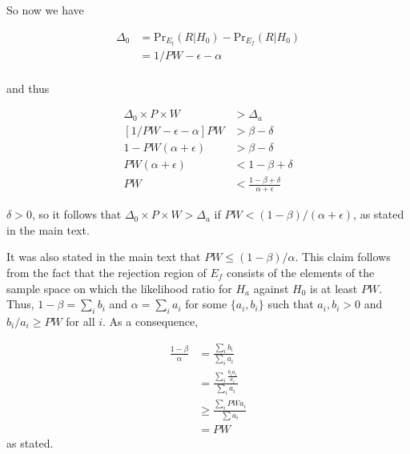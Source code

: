 \documentclass{article}
\theoremstyle{definition}
\begin{document}
So now we have

\begin{align*}
\Delta_0 &=\mbox{Pr}_{E_t}(R|H_0)-\mbox{Pr}_{E_f}(R|H_0)\\
&= 1/PW-\epsilon-\alpha\\
\end{align*}

and thus

\begin{align*}
\Delta_0\times P\times W &> \Delta_a\\
[1/PW-\epsilon-\alpha]PW&>\beta-\delta\\
1-PW(\alpha+\epsilon)&>\beta-\delta\\
PW(\alpha+\epsilon) &< 1-\beta+\delta\\
PW &< \frac{1-\beta+\delta}{\alpha+\epsilon}
\end{align*}

$\delta>0$, so it follows that $\Delta_0\times P\times W>\Delta_a$ if $PW < (1-\beta)/(\alpha+\epsilon)$, as stated in the main text.

It was also stated in the main text that $PW \leq (1-\beta)/\alpha$.
This claim follows from the fact that the rejection region of $E_f$ consists of the elements of the sample space on which the likelihood ratio for $H_a$ against $H_0$ is at least $PW$.
Thus, $1-\beta=\sum_i b_i$ and $\alpha=\sum_i a_i$ for some $\{a_i,b_i\}$ such that $a_i,b_i>0$ and $b_i/a_i\geq PW$ for all $i$.
As a consequence,

\begin{align*}
\frac{1-\beta}{\alpha}&=\frac{\sum_i b_i}{\sum_i a_i}\\
&=\frac{\sum_i \frac{b_i a_i}{a_i}}{\sum_i a_i}\\
&\geq \frac{\sum_i PW a_i}{\sum a_i}\\
&= PW
\end{align*}
as stated.
\end{document}

